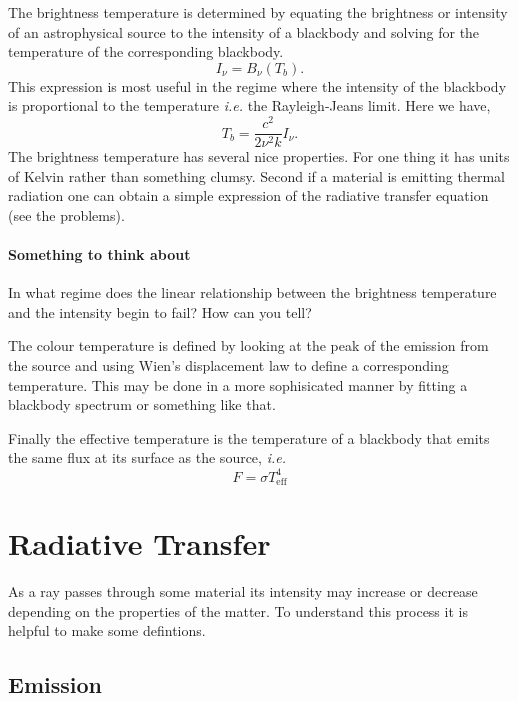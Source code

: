 The brightness temperature is determined by equating the brightness or 
intensity of an astrophysical source to the intensity of a blackbody
and solving for the temperature of the corresponding blackbody. 
\begin{equation}
I_\nu = B_\nu(T_b).
\label{eq:46}
\end{equation}
This expression is most useful in the regime where the intensity of
the blackbody is proportional to the temperature {\em i.e.} the
Rayleigh-Jeans limit.  Here we have,
\begin{equation}
T_b = \frac{c^2}{2\nu^2 k} I_\nu.
\label{eq:47}
\end{equation}
The brightness temperature has several nice properties. 
For one thing it has units of Kelvin rather than something
clumsy. Second if a material is emitting thermal radiation one can
obtain a simple expression of the radiative transfer equation 
(see the problems).

\paragraph{Something to think about} 
In what regime does the linear relationship between the brightness
temperature and the intensity begin to fail?  How can you tell?

The colour temperature is defined by looking at the peak of the
emission from the source and using Wien's displacement law to define a 
corresponding temperature.   This may be done in a more sophisicated
manner by fitting a blackbody spectrum or something like that.

Finally the effective temperature is the temperature of a blackbody
that emits the same flux at its surface as the source, {\em i.e.}
\begin{equation}
F = \sigma T_\mathrm{eff}^4
\label{eq:791}
\end{equation}

\section{Radiative Transfer}
\label{sec:radiative-transfer}
As a ray passes through some material its intensity may increase or
decrease depending on the properties of the matter.  To understand
this process it is helpful to make some defintions.

\subsection{Emission}
\label{sec:emission}

